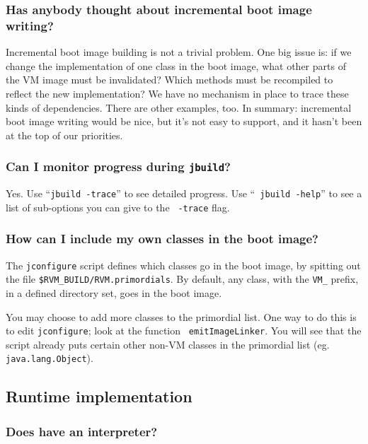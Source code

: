 \subsubsection{Has anybody thought about incremental boot image writing?}%
%

Incremental boot image building is not a trivial problem.  One big
issue is: if we change the implementation of one class in the boot image,
what other parts of the VM image must be invalidated?  Which
methods must be recompiled to reflect the new implementation?  We have no
mechanism in place to trace these kinds of dependencies.  There are other
examples, too.  In summary: incremental boot image writing would be nice,
but it's not easy to support, and it hasn't been at the top of our
priorities.

\subsubsection{Can I monitor progress during {\tt jbuild}?}

Yes.  Use ``{\tt jbuild -trace}'' to see detailed progress.  Use ``{\tt
jbuild -help}'' to see a list of sub-options you can give to the {\tt
-trace} flag.

\subsubsection{How can I include my own classes in the boot image?}

The {\tt jconfigure} script defines which classes go in the boot image, by
spitting out the file {\tt \$RVM\_\-BUILD/\-RVM.\-primordials}.  By default, any
class, with the {\tt VM\_} prefix, in a defined directory set, goes in the
boot image.

You may choose to add more classes to the primordial list.  One way to do
this is to edit {\tt jconfigure}; look at the function {\tt
emitImageLinker}.  You will see that the script already puts certain other
non-VM classes in the primordial list (eg. {\tt java.lang.Object}).

\subsection{Runtime implementation}

\subsubsection{Does \jrvm{} have an interpreter?}

